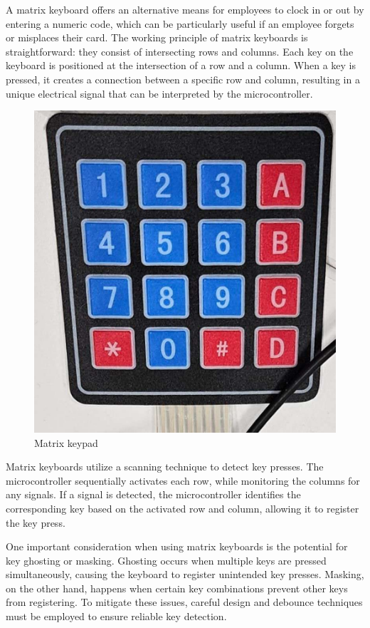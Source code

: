 A matrix keyboard offers an alternative means for employees to clock in or out by entering a numeric code, which can be 
particularly useful if an employee forgets or misplaces their card. The working principle of matrix keyboards is 
straightforward: they consist of intersecting rows and columns. 
Each key on the keyboard is positioned at the intersection of a row and a column. When a key is pressed, it creates a 
connection between a specific row and column, resulting in a unique electrical signal that can be interpreted by the 
microcontroller.

\begin{figure}[h]
    \centering
    \begin{minipage}[b]{0.45\textwidth}
        \centering
        \includegraphics[width=.8\textwidth]{Imagenes/Vectorial/matrix_keypad.pdf}
        \caption{Matrix keypad}
        \label{fig:matrix_keypad}
    \end{minipage}
\end{figure}


Matrix keyboards utilize a scanning technique to detect key presses. The microcontroller sequentially activates each row, 
while monitoring the columns for any signals. If a signal is detected, the microcontroller identifies the corresponding key 
based on the activated row and column, allowing it to register the key press.

One important consideration when using matrix keyboards is the potential for key ghosting or masking. Ghosting occurs when 
multiple keys are pressed simultaneously, causing the keyboard to register unintended key presses. Masking, on the other hand, 
happens when certain key combinations prevent other keys from registering. To mitigate these issues, careful design and 
debounce techniques must be employed to ensure reliable key detection.

